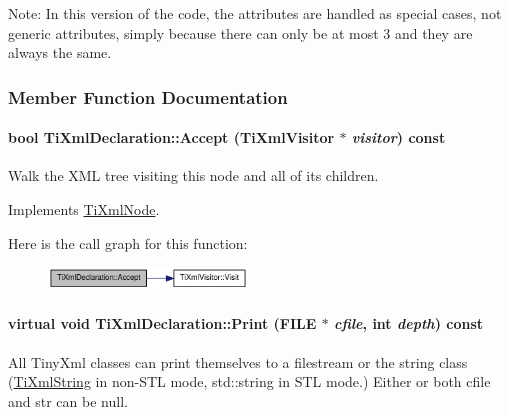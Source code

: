 Note: In this version of the code, the attributes are handled as special cases, not generic attributes, simply because there can only be at most 3 and they are always the same. 

\subsubsection{Member Function Documentation}
\hypertarget{class_ti_xml_declaration_ab6a6b178161ba9abc2c35058de689864}{
\paragraph[{Accept}]{\setlength{\rightskip}{0pt plus 5cm}bool TiXmlDeclaration::Accept ({\bf TiXmlVisitor} $\ast$ {\em visitor}) const}\hfill}
\label{class_ti_xml_declaration_ab6a6b178161ba9abc2c35058de689864}
Walk the XML tree visiting this node and all of its children. 

Implements \hyperlink{class_ti_xml_node_acc0f88b7462c6cb73809d410a4f5bb86}{TiXmlNode}.

Here is the call graph for this function:\nopagebreak
\begin{figure}[H]
\begin{center}
\leavevmode
\includegraphics[width=150pt]{class_ti_xml_declaration_ab6a6b178161ba9abc2c35058de689864_cgraph}
\end{center}
\end{figure}
\hypertarget{class_ti_xml_declaration_abf6303db4bd05b5be554036817ff1cb4}{
\paragraph[{Print}]{\setlength{\rightskip}{0pt plus 5cm}virtual void TiXmlDeclaration::Print (FILE $\ast$ {\em cfile}, \/  int {\em depth}) const}\hfill}
\label{class_ti_xml_declaration_abf6303db4bd05b5be554036817ff1cb4}
All TinyXml classes can print themselves to a filestream or the string class (\hyperlink{class_ti_xml_string}{TiXmlString} in non-\/STL mode, std::string in STL mode.) Either or both cfile and str can be null.

